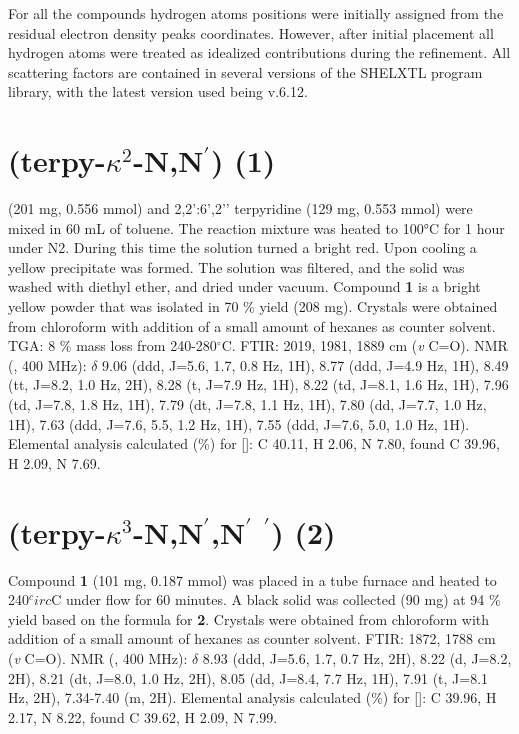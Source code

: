 For all the compounds hydrogen atoms positions were initially assigned from the residual electron density peaks coordinates. However, after initial placement all hydrogen atoms were treated as idealized contributions during the refinement. All scattering factors are contained in several versions of the SHELXTL program library, with the latest version used being v.6.12\autocite{sheldrick2008}.


\section{(terpy-$\kappa^2$-N,N$^\prime$) (1)} \label{sec.c1}
 (201 mg,  0.556 mmol) and 2,2’:6’,2’’ terpyridine (129 mg, 0.553 mmol) were mixed in 60 mL of toluene. The reaction mixture was heated to 100°C for 1 hour under N2. During this time the solution turned a bright red. Upon cooling a yellow precipitate was formed. The solution was filtered, and the solid was washed with diethyl ether, and dried under vacuum. Compound \textbf{1} is a bright yellow powder that was isolated in 70 \% yield (208 mg). Crystals were obtained from chloroform with addition of a small amount of hexanes as counter solvent. TGA: 8 \% mass loss from 240-280$^\circ$C.  FTIR: 2019, 1981, 1889 cm (\textit{v} C=O).  NMR (, 400 MHz): $\delta$ 9.06 (ddd, J=5.6, 1.7, 0.8 Hz, 1H), 8.77 (ddd, J=4.9 Hz, 1H), 8.49 (tt, J=8.2, 1.0 Hz, 2H), 8.28 (t, J=7.9 Hz, 1H), 8.22 (td, J=8.1, 1.6 Hz, 1H), 7.96 (td, J=7.8, 1.8 Hz, 1H), 7.79 (dt, J=7.8, 1.1 Hz, 1H), 7.80 (dd, J=7.7, 1.0 Hz, 1H), 7.63 (ddd, J=7.6, 5.5, 1.2 Hz, 1H), 7.55 (ddd, J=7.6, 5.0, 1.0 Hz, 1H). Elemental analysis calculated (\%) for []: C 40.11, H 2.06, N 7.80, found C 39.96, H 2.09, N 7.69.

\section{(terpy-$\kappa^3$-N,N$^\prime$,N$^\prime$ $^\prime$) (2)} \label{sec.c2}
Compound \textbf{1} (101 mg, 0.187 mmol) was placed in a tube furnace and heated to 240$^circ$C under  flow for 60 minutes. A black solid was collected (90 mg) at 94 \% yield based on the formula for \textbf{2}. Crystals were obtained from chloroform with addition of a small amount of hexanes as counter solvent. FTIR: 1872, 1788 cm (\textit{v} C=O).  NMR (, 400 MHz): $\delta$ 8.93 (ddd, J=5.6, 1.7, 0.7 Hz, 2H), 8.22 (d, J=8.2, 2H), 8.21 (dt, J=8.0, 1.0 Hz, 2H), 8.05 (dd, J=8.4, 7.7 Hz, 1H), 7.91 (t, J=8.1 Hz, 2H), 7.34-7.40 (m, 2H). Elemental analysis calculated (\%) for []: C 39.96, H 2.17, N 8.22, found C 39.62, H 2.09, N 7.99.

